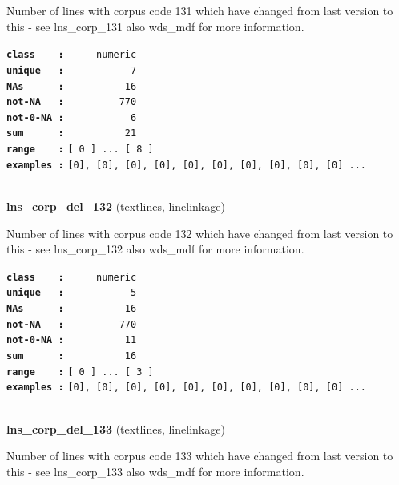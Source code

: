\documentclass[]{article}
\begin{document}
Number of lines with corpus code 131 which have changed from last
version to this - see lns\_corp\_131 also wds\_mdf for more information.

\textbf{\texttt{class\ \ \ \ :}} \texttt{~~~~~numeric}\\
\textbf{\texttt{unique\ \ \ :}} \texttt{~~~~~~~~~~~7}\\
\textbf{\texttt{NAs\ \ \ \ \ \ :}} \texttt{~~~~~~~~~~16}\\
\textbf{\texttt{not-NA\ \ \ :}} \texttt{~~~~~~~~~770}\\
\textbf{\texttt{not-0-NA\ :}} \texttt{~~~~~~~~~~~6}\\
\textbf{\texttt{sum\ \ \ \ \ \ :}} \texttt{~~~~~~~~~~21}\\
\textbf{\texttt{range\ \ \ \ :}}
\texttt{{[}\ 0\ {]}\ ...\ {[}\ 8\ {]}}\\
\textbf{\texttt{examples\ :}}
\texttt{{[}0{]},\ {[}0{]},\ {[}0{]},\ {[}0{]},\ {[}0{]},\ {[}0{]},\ {[}0{]},\ {[}0{]},\ {[}0{]},\ {[}0{]}\ ...}\\

~

\textbf{lns\_corp\_del\_132} (textlines, linelinkage)

Number of lines with corpus code 132 which have changed from last
version to this - see lns\_corp\_132 also wds\_mdf for more information.

\textbf{\texttt{class\ \ \ \ :}} \texttt{~~~~~numeric}\\
\textbf{\texttt{unique\ \ \ :}} \texttt{~~~~~~~~~~~5}\\
\textbf{\texttt{NAs\ \ \ \ \ \ :}} \texttt{~~~~~~~~~~16}\\
\textbf{\texttt{not-NA\ \ \ :}} \texttt{~~~~~~~~~770}\\
\textbf{\texttt{not-0-NA\ :}} \texttt{~~~~~~~~~~11}\\
\textbf{\texttt{sum\ \ \ \ \ \ :}} \texttt{~~~~~~~~~~16}\\
\textbf{\texttt{range\ \ \ \ :}}
\texttt{{[}\ 0\ {]}\ ...\ {[}\ 3\ {]}}\\
\textbf{\texttt{examples\ :}}
\texttt{{[}0{]},\ {[}0{]},\ {[}0{]},\ {[}0{]},\ {[}0{]},\ {[}0{]},\ {[}0{]},\ {[}0{]},\ {[}0{]},\ {[}0{]}\ ...}\\

~

\textbf{lns\_corp\_del\_133} (textlines, linelinkage)

Number of lines with corpus code 133 which have changed from last
version to this - see lns\_corp\_133 also wds\_mdf for more information.
\end{document}
